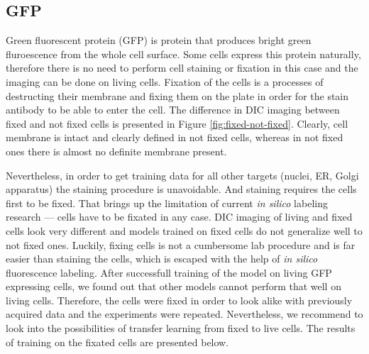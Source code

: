 \subsection{GFP}
    Green fluorescent protein (GFP) is protein that produces bright green fluroescence from the whole cell surface. Some cells express this protein naturally, therefore there is no need to perform cell staining or fixation in this case and the imaging can be done on living cells. Fixation of the cells is a processes of destructing their membrane and fixing them on the plate in order for the stain antibody to be able to enter the cell. The difference in DIC imaging between fixed and not fixed cells is presented in Figure \ref{fig:fixed-not-fixed}. Clearly, cell membrane is intact and clearly defined in not fixed cells, whereas in not fixed ones there is almost no definite membrane present. 
    
    Nevertheless, in order to get training data for all other targets (nuclei, ER, Golgi apparatus) the staining procedure is unavoidable. And staining requires the cells first to be fixed. That brings up the limitation of current \textit{in silico} labeling research --- cells have to be fixated in any case. DIC imaging of living and fixed cells look very different and models trained on fixed cells do not generalize well to not fixed ones. Luckily, fixing cells is not a cumbersome lab procedure and is far easier than staining the cells, which is escaped with the help of \textit{in silico} fluorescence labeling. After successfull training of the model on living GFP expressing cells, we found out that other models cannot perform that well on living cells. Therefore, the cells were fixed in order to look alike with previously acquired data and the experiments were repeated. Nevertheless, we recommend to look into the possibilities of transfer learning from fixed to live cells. The results of training on the fixated cells are presented below. 
    
